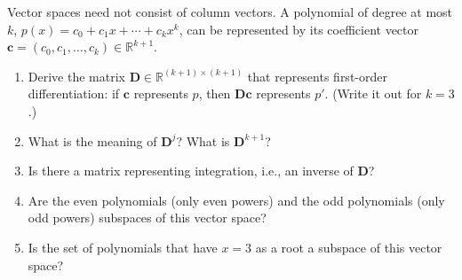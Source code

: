 \begin{exercise} %
    Vector spaces need not consist of column vectors. A polynomial of degree at most $k$, $p(x) = c_0 + c_1 x + \cdots + c_k x^k$, can be represented by its coefficient vector $\mathbf{c} = (c_0, c_1, \dots, c_k) \in \mathbb{R}^{k+1}$.
    \begin{enumerate}[label=(\alph*)]
        \item Derive the matrix $\mathbf{D} \in \mathbb{R}^{(k+1) \times (k+1)}$ that represents first-order differentiation: if $\mathbf{c}$ represents $p$, then $\mathbf{D}\mathbf{c}$ represents $p'$. (Write it out for $k = 3$.)
        \item What is the meaning of $\mathbf{D}^j$? What is $\mathbf{D}^{k+1}$?
        \item Is there a matrix representing integration, i.e., an inverse of $\mathbf{D}$?
        \item Are the even polynomials (only even powers) and the odd polynomials (only odd powers) subspaces of this vector space?
        \item Is the set of polynomials that have $x = 3$ as a root a subspace of this vector space?
    \end{enumerate}
\end{exercise}

